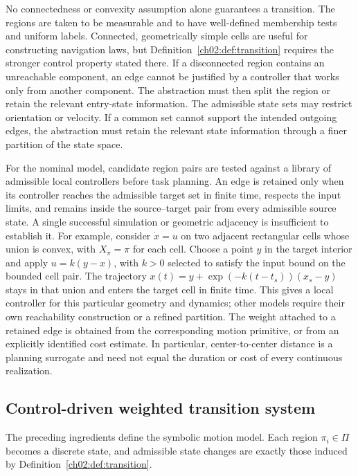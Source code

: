 \begin{revision}
No connectedness or convexity assumption alone guarantees a transition.
The regions are taken to be measurable and to have well-defined membership
tests and uniform labels. Connected, geometrically simple cells are useful
for constructing navigation laws, but Definition~\ref{ch02:def:transition}
requires the stronger control property stated there. If a disconnected
region contains an unreachable component, an edge cannot be justified by a
controller that works only from another component. The abstraction must
then split the region or retain the relevant entry-state information.
The admissible state sets may restrict orientation or velocity. If a common
set cannot support the intended outgoing edges, the abstraction must retain
the relevant state information through a finer partition of the state space.

For the nominal model, candidate region pairs are tested against a library
of admissible local controllers before task planning. An edge is retained only
when its controller reaches the admissible target set in finite time,
respects the input limits, and remains inside the source--target pair from
every admissible source state. A single successful simulation or
geometric adjacency is insufficient to establish it.
For example, consider $\dot{x}=u$ on two adjacent rectangular cells whose
union is convex, with $X_\pi=\pi$ for each cell. Choose a point $y$ in the
target interior and apply $u=k(y-x)$, with $k>0$ selected to satisfy the input bound on the
bounded cell pair. The trajectory
$x(t)=y+\exp(-k(t-t_s))(x_s-y)$ stays in that union and enters the target
cell in finite time. This gives a local controller for this particular
geometry and dynamics; other models require their own reachability
construction or a refined partition.
The weight attached to a retained edge is obtained from the corresponding
motion primitive, or from an explicitly identified cost estimate. In
particular, center-to-center distance is a planning surrogate and need not
equal the duration or cost of every continuous realization.
\end{revision}


\subsection{Control-driven weighted transition system}
\label{ch02:subsec:FTS}

The preceding ingredients define the symbolic motion model. Each region
$\pi_i \in \Pi$ becomes a discrete state, and admissible state changes are
exactly those induced by Definition~\ref{ch02:def:transition}.

